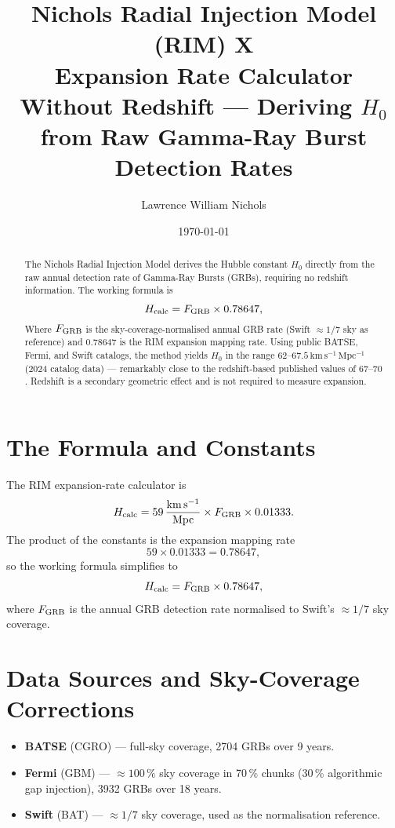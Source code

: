 \documentclass[12pt]{article}
\title{Nichols Radial Injection Model (RIM) X\\
Expansion Rate Calculator Without Redshift --- Deriving \(H_0\) from Raw Gamma-Ray Burst Detection Rates}
\author{Lawrence William Nichols}
\date{\today}
\begin{document}
\maketitle

\begin{abstract}
The Nichols Radial Injection Model derives the Hubble constant \(H_0\) directly from the raw annual detection rate of Gamma-Ray Bursts (GRBs), requiring no redshift information. The working formula is
\[
H_{\rm calc} = F_{\rm GRB} \times 0.78647,
\]
Where \(F_{\rm GRB}\) is the sky-coverage-normalised annual GRB rate (Swift \(\approx 1/7\) sky as reference) and \(0.78647\) is the RIM expansion mapping rate. Using public BATSE, Fermi, and Swift catalogs, the method yields \(H_0\) in the range \(62\)--\(67.5\,\mathrm{km\,s^{-1}\,Mpc^{-1}}\) (2024 catalog data) — remarkably close to the redshift-based published values of \(67\)--\(70\). Redshift is a secondary geometric effect and is not required to measure expansion.
\end{abstract}

\section{The Formula and Constants}

The RIM expansion-rate calculator is
\[
H_{\rm calc} = 59\,\frac{\mathrm{km\,s^{-1}}}{\mathrm{Mpc}} \times F_{\rm GRB} \times 0.01333.
\]
The product of the constants is the expansion mapping rate
\[
59 \times 0.01333 = 0.78647,
\]
so the working formula simplifies to
\[
H_{\rm calc} = F_{\rm GRB} \times 0.78647,
\]
where \(F_{\rm GRB}\) is the annual GRB detection rate normalised to Swift’s \(\approx 1/7\) sky coverage.

\section{Data Sources and Sky-Coverage Corrections}

\begin{itemize}
\item \textbf{BATSE} (CGRO) — full-sky coverage, 2704 GRBs over 9 years.
\item \textbf{Fermi} (GBM) — \(\approx 100\,\%\) sky coverage in 70\,\% chunks (30\,\% algorithmic gap injection), 3932 GRBs over 18 years.
\item \textbf{Swift} (BAT) — \(\approx 1/7\) sky coverage, used as the normalisation reference.
\end{itemize}
\end{document}
